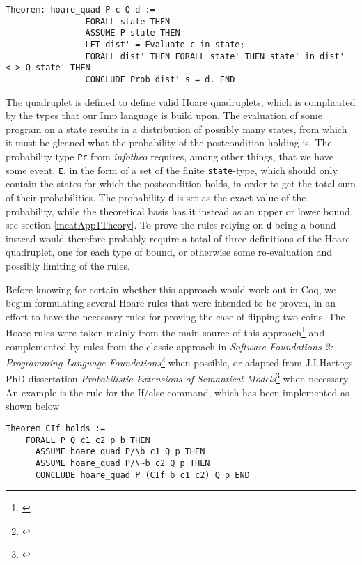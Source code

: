 \begin{verbatim}
Theorem: hoare_quad P c Q d := 
                FORALL state THEN
                ASSUME P state THEN
                LET dist' = Evaluate c in state;
                FORALL dist' THEN FORALL state' THEN state' in dist' <-> Q state' THEN
                CONCLUDE Prob dist' s = d. END
\end{verbatim}

The quadruplet is defined to define valid Hoare quadruplets, which is complicated by the types that our Imp language is build upon. The evaluation of some program on a state results in a distribution of possibly many states, from which it must be gleaned what the probability of the postcondition holding is. The probability type \texttt{Pr} from \textit{infotheo} requires, among other things, that we have some event, \texttt{E}, in the form of a set of the finite \texttt{state}-type, which should only contain the states for which the postcondition holds, in order to get the total sum of their probabilities.
The probability \texttt{d} is set as the exact value of the probability, while the theoretical basis has it instead as an upper or lower bound, see section \ref{meatApp1Theory}. To prove the rules relying on \texttt{d} being a bound instead would therefore probably require a total of three definitions of the Hoare quadruplet, one for each type of bound, or otherwise some re-evaluation and possibly limiting of the rules.

Before knowing for certain whether this approach would work out in Coq, we begun formulating several Hoare rules that were intended to be proven, in an effort to have the necessary rules for proving the case of flipping two coins. The Hoare rules were taken mainly from the main source of this approach\footnote{\textcite{HoareSlides}} and complemented by rules from the classic approach in \textit{Software Foundations 2: Programming Language Foundations}\footnote{\textcite{SF2}} when possible, or adapted from J.I.Hartogs PhD dissertation \textit{Probabilistic Extensions of Semantical Models}\footnote{\textcite{PHdProbExtensions}} when necessary. An example is the rule for the If/else-command, which has been implemented as shown below

\begin{verbatim}
Theorem CIf_holds :=
    FORALL P Q c1 c2 p b THEN
      ASSUME hoare_quad P/\b c1 Q p THEN
      ASSUME hoare_quad P/\~b c2 Q p THEN 
      CONCLUDE hoare_quad P (CIf b c1 c2) Q p END
\end{verbatim}

